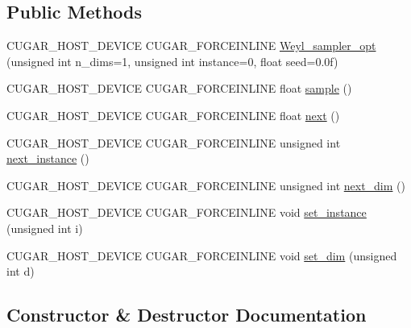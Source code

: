 \subsection*{Public Methods}
\begin{DoxyCompactItemize}
\item 
C\+U\+G\+A\+R\+\_\+\+H\+O\+S\+T\+\_\+\+D\+E\+V\+I\+CE C\+U\+G\+A\+R\+\_\+\+F\+O\+R\+C\+E\+I\+N\+L\+I\+NE \hyperlink{classcugar_1_1_weyl__sampler__opt_abe246c4e21c96b5b0a53fdc112f5438e}{Weyl\+\_\+sampler\+\_\+opt} (unsigned int n\+\_\+dims=1, unsigned int instance=0, float seed=0.\+0f)
\item 
C\+U\+G\+A\+R\+\_\+\+H\+O\+S\+T\+\_\+\+D\+E\+V\+I\+CE C\+U\+G\+A\+R\+\_\+\+F\+O\+R\+C\+E\+I\+N\+L\+I\+NE float \hyperlink{classcugar_1_1_weyl__sampler__opt_aec87ab41207bf714c3d6c9a0ad846568}{sample} ()
\item 
C\+U\+G\+A\+R\+\_\+\+H\+O\+S\+T\+\_\+\+D\+E\+V\+I\+CE C\+U\+G\+A\+R\+\_\+\+F\+O\+R\+C\+E\+I\+N\+L\+I\+NE float \hyperlink{classcugar_1_1_weyl__sampler__opt_a1b17dcdc362e66be807938d691455d11}{next} ()
\item 
C\+U\+G\+A\+R\+\_\+\+H\+O\+S\+T\+\_\+\+D\+E\+V\+I\+CE C\+U\+G\+A\+R\+\_\+\+F\+O\+R\+C\+E\+I\+N\+L\+I\+NE unsigned int \hyperlink{classcugar_1_1_weyl__sampler__opt_a3f3762ed4fd1a0b3bc9ca163f15b8fb9}{next\+\_\+instance} ()
\item 
C\+U\+G\+A\+R\+\_\+\+H\+O\+S\+T\+\_\+\+D\+E\+V\+I\+CE C\+U\+G\+A\+R\+\_\+\+F\+O\+R\+C\+E\+I\+N\+L\+I\+NE unsigned int \hyperlink{classcugar_1_1_weyl__sampler__opt_a08292e9f6053315e5be2419ed54c4069}{next\+\_\+dim} ()
\item 
C\+U\+G\+A\+R\+\_\+\+H\+O\+S\+T\+\_\+\+D\+E\+V\+I\+CE C\+U\+G\+A\+R\+\_\+\+F\+O\+R\+C\+E\+I\+N\+L\+I\+NE void \hyperlink{classcugar_1_1_weyl__sampler__opt_ab6248f98d32ea51e4b7f803474bb05e3}{set\+\_\+instance} (unsigned int i)
\item 
C\+U\+G\+A\+R\+\_\+\+H\+O\+S\+T\+\_\+\+D\+E\+V\+I\+CE C\+U\+G\+A\+R\+\_\+\+F\+O\+R\+C\+E\+I\+N\+L\+I\+NE void \hyperlink{classcugar_1_1_weyl__sampler__opt_a1120c5c45ac2dec8669de86767eaca08}{set\+\_\+dim} (unsigned int d)
\end{DoxyCompactItemize}


\subsection{Constructor \& Destructor Documentation}
\mbox{\label{classcugar_1_1_weyl__sampler__opt_abe246c4e21c96b5b0a53fdc112f5438e}} 
